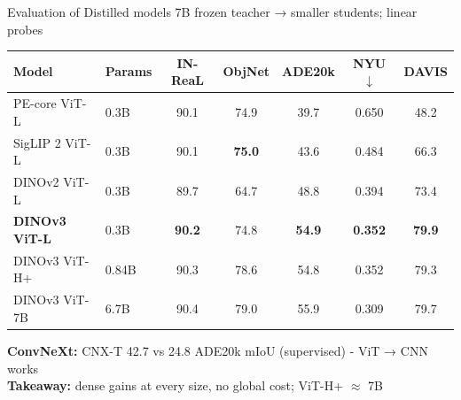\documentclass[aspectratio=169,11pt]{beamer}
\begin{document}
\begin{frame}{Evaluation of Distilled models}
    7B frozen teacher → smaller students; linear probes
    \vspace{5px}
    \begin{table}
        \centering
        \footnotesize
        \setlength{\tabcolsep}{4pt}
        \begin{tabular}{l l c c c c c}
            \toprule[1.5pt]
            \textbf{Model} & \textbf{Params} & \textbf{IN-ReaL} & \textbf{ObjNet} & \textbf{ADE20k} & \textbf{NYU $\downarrow$} & \textbf{DAVIS} \\
            \midrule[1.5pt]
            PE-core ViT-L & 0.3B & 90.1 & 74.9 & 39.7 & 0.650 & 48.2 \\
            SigLIP 2 ViT-L & 0.3B & 90.1 & \textbf{75.0} & 43.6 & 0.484 & 66.3 \\
            DINOv2 ViT-L & 0.3B & 89.7 & 64.7 & 48.8 & 0.394 & 73.4 \\
            \textbf{DINOv3 ViT-L} & 0.3B & \textbf{90.2} & 74.8 & \textbf{54.9} & \textbf{0.352} & \textbf{79.9} \\
            \midrule
            DINOv3 ViT-H+ & 0.84B & 90.3 & 78.6 & 54.8 & 0.352 & 79.3 \\
            DINOv3 ViT-7B & 6.7B & 90.4 & 79.0 & 55.9 & 0.309 & 79.7 \\
            \bottomrule[1.5pt]
        \end{tabular}
    \end{table}
    \vspace{5px}
    \textbf{ConvNeXt:} CNX-T 42.7 vs 24.8 ADE20k mIoU (supervised) - ViT → CNN works\\
    \vspace{5px}
    \textbf{Takeaway:} dense gains at every size, no global cost; ViT-H+ $\approx$ 7B
\end{frame}
\end{document}
